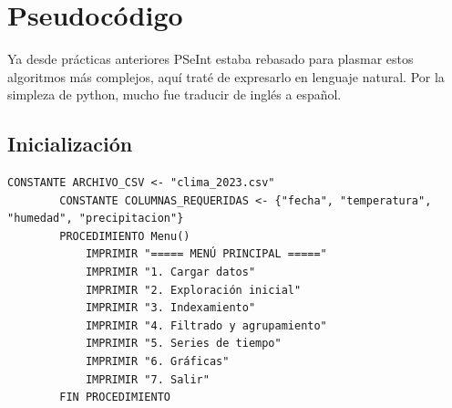\documentclass{assignment}
\begin{document}
		\section*{Pseudocódigo}
	Ya desde prácticas anteriores PSeInt estaba rebasado para plasmar estos algoritmos más complejos, aquí traté de expresarlo en lenguaje natural. Por la simpleza de python, mucho fue traducir de inglés a español.
	\subsection*{Inicialización}
	\begin{lstlisting}[caption={Inicialización}, label={lst:inicio}]
		CONSTANTE ARCHIVO_CSV <- "clima_2023.csv"
		CONSTANTE COLUMNAS_REQUERIDAS <- {"fecha", "temperatura", "humedad", "precipitacion"}
		PROCEDIMIENTO Menu()
			IMPRIMIR "===== MENÚ PRINCIPAL ====="
			IMPRIMIR "1. Cargar datos"
			IMPRIMIR "2. Exploración inicial"
			IMPRIMIR "3. Indexamiento"
			IMPRIMIR "4. Filtrado y agrupamiento"
			IMPRIMIR "5. Series de tiempo"
			IMPRIMIR "6. Gráficas"
			IMPRIMIR "7. Salir"
		FIN PROCEDIMIENTO
	\end{lstlisting}
\end{document}
